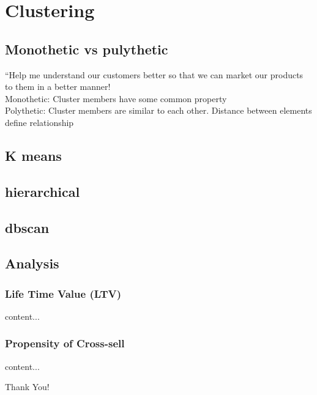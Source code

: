 \documentclass{beamer}
\begin{document}
\section{Clustering}
\subsection{Monothetic vs pulythetic}
\begin{frame}
	“Help me understand our customers better so that we can market our products to them in a better manner!\\
	Monothetic: Cluster members have some common property\\
	Polythetic: Cluster members are similar to each other. Distance between elements define relationship\\
\end{frame}

\subsection{K means}

\subsection{hierarchical}

\subsection{dbscan}


\subsection{Analysis}

\begin{frame}\frametitle{Life Time Value (LTV)}
	content...
\end{frame}
\begin{frame}\frametitle{Propensity of Cross-sell}
content...
\end{frame}

\begin{frame}
	Thank You!
\end{frame}
\end{document}
